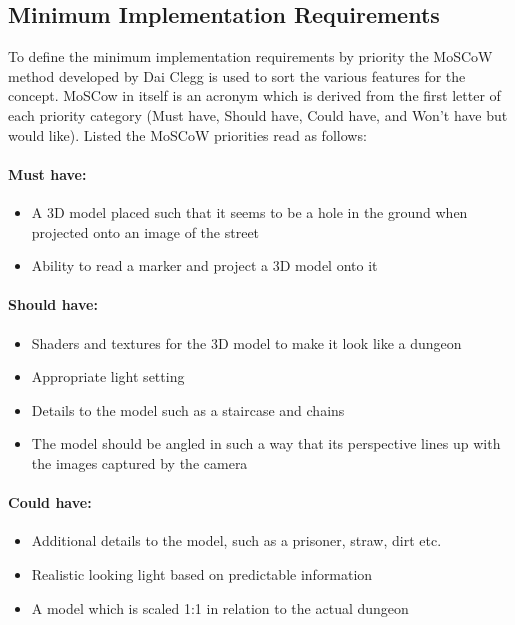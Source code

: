 \subsection{Minimum Implementation Requirements}
To define the minimum implementation requirements by priority the MoSCoW method developed by Dai Clegg \cite{Kuhn2009} is used to sort the various features for the concept. MoSCow in itself is an acronym which is derived from the first letter of each priority category (Must have, Should have, Could have, and Won’t have but would like). Listed the MoSCoW priorities read as follows:

\paragraph{Must have:}
\begin{itemize}
\item A 3D model placed such that it seems to be a hole in the ground when projected onto an image of the street
\item Ability to read a marker and project a 3D model onto it
\end{itemize}

\paragraph{Should have:}
\begin{itemize}
\item Shaders and textures for the 3D model to make it look like a dungeon
\item Appropriate light setting
\item Details to the model such as a staircase and chains
\item The model should be angled in such a way that its perspective lines up with the images captured by the camera
\end{itemize}

\paragraph{Could have:}
\begin{itemize}
\item Additional details to the model, such as a prisoner, straw, dirt etc.
\item Realistic looking light based on predictable information
\item A model which is scaled 1:1 in relation to the actual dungeon
\end{itemize}


